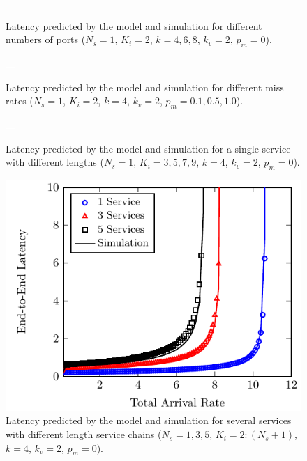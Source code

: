 
\begin{figure}
	\centering
	\begin{minipage}[b]{.49\textwidth}
		\includegraphics[width=\linewidth]{graphs/diff_lengths}
		\caption{Latency predicted by the model and simulation for different numbers
		of ports ($N_s=1$, $K_i=2$, $k={4,6,8}$, $k_v=2$, $p_m=0$).}
		\label{fig:num_ports}
	\end{minipage}
	\hfill
	\begin{minipage}[b]{.49\textwidth}
		\includegraphics[width=\linewidth]{graphs/diff_sdn}
		\caption{Latency predicted by the model and simulation for different miss rates ($N_s=1$, $K_i=2$, $k=4$, $k_v=2$, $p_m={0.1,0.5,1.0}$).}
		\label{fig:sdn_perc}
	\end{minipage}

	\vspace{2mm}

	\begin{minipage}[b]{.49\textwidth}
		\includegraphics[width=\linewidth]{graphs/diff_lengths}
		\caption{Latency predicted by the model and simulation for a single service with different lengths ($N_s=1$, $K_i={3,5,7,9}$, $k=4$, $k_v =2$, $p_m=0$).}
		\label{fig:length_chain}
	\end{minipage}
	\hfill
	\begin{minipage}[b]{.49\textwidth}
		\includegraphics[width=\linewidth]{graphs/mult_services}
		\caption{Latency predicted by the model and simulation for several services
		with different length service chains ($N_s={1,3,5}$, $K_i=2:(N_s+1)$, $k=4$, $k_v=2$, $p_m=0$).}
		\label{fig:mult_services}
	\end{minipage}


\end{figure}
